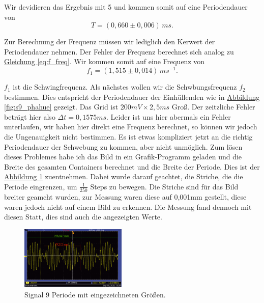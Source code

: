 Wir devidieren das Ergebnis mit 5 und kommen somit auf eine Periodendauer von 
\begin{equation}
\boxed{
    T = (0,660 \pm 0,006) \, ms
}.
\end{equation}

Zur Berechnung der Frequenz müssen wir lediglich den Kerwert der Periodendauer nehmen. Der Fehler der Frequenz berechnet sich analog zu \hyperref[eq:f_freq]{Gleichung \ref*{eq:f_freq}}. Wir kommen somit auf eine Frequenz von
\begin{equation}
\boxed{
    f_1 = (1,515 \pm 0,014) \, ms^{-1}
}.
\end{equation}

$f_1$ ist die Schwingfrequenz. Als nächstes wollen wir die Schwbungsfrequenz $f_2$ bestimmen. Dies entspricht der Periodendauer der Einhüllenden wie in \hyperref[fig:s9_phahue]{Abbildung \ref*{fig:s9_phahue}} gezeigt. Das Grid ist $200mV \times 2,5ms$ Groß.
Der zeitzliche Fehler beträgt hier also $\Delta t = 0,1575ms$. Leider ist uns hier abermals ein Fehler unterlaufen, wir haben hier direkt eine Frequenz berechnet, so können wir jedoch die Ungenauigkeit nicht bestimmen. Es ist etwas kompliziert jetzt an die richtig Periodendauer der Schwebung zu kommen, aber nicht unmöglich. Zum lösen dieses Problemes habe ich das Bild in ein Grafik-Programm geladen und die Breite des gesamten Containers berechnet und die Breite der Periode. Dies ist der \hyperref[fig:s9_Pschweb]{Abbildung \ref*{fig:s9_Pschweb}} zuentnehmen. Dabei wurde darauf geachtet, die Striche, die die Periode eingrenzen, um $\frac{1}{250}$ Steps zu bewegen. Die Striche sind für das Bild breiter geamcht wurden, zur Messung waren diese auf 0,001mm gestellt, diese waren jedoch nicht auf einem Bild zu erkennen. Die Messung fand dennoch mit diesen Statt, dies sind auch die angezeigten Werte.

\begin{figure} [h!]
    \centering
        \includegraphics[width=0.45\textwidth]{img/25/Signale2/Sig9-PeriodeSchwebung.pdf}
    \caption{Signal 9 Periode mit eingezeichneten Größen.}
    \label{fig:s9_Pschweb}
\end{figure}

